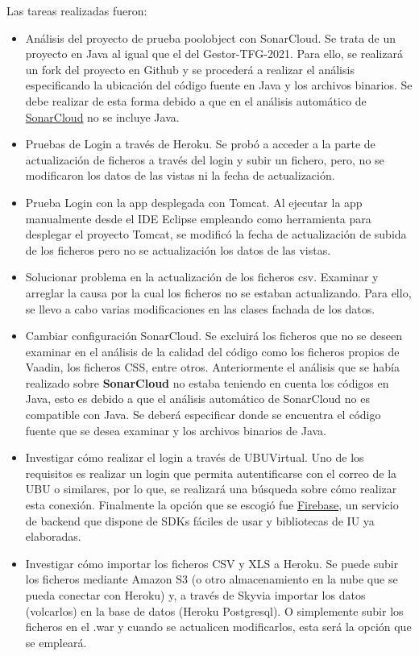Las tareas realizadas fueron:
\begin{itemize}
	\tightlist
	\item Análisis del proyecto de prueba poolobject con SonarCloud.
		Se trata de un proyecto en Java al igual que el del Gestor-TFG-2021. Para ello, se realizará un fork del proyecto en Github y se procederá a realizar el análisis especificando la ubicación del código fuente en Java y los archivos binarios. Se debe realizar de esta forma debido a que en el análisis automático de \href{https://sonarcloud.io/}{SonarCloud} no se incluye Java.
	\item Pruebas de Login a través de Heroku. 
		Se probó a acceder a la parte de actualización de ficheros a través del login y subir un fichero, pero, no se modificaron los datos de las vistas ni la fecha de actualización.
	\item Prueba Login con la app desplegada con Tomcat. 
		Al ejecutar la app manualmente desde el IDE Eclipse empleando como herramienta para desplegar el proyecto Tomcat, se modificó la fecha de actualización de subida de los ficheros pero no se actualización los datos de las vistas.
	\item Solucionar problema en la actualización de los ficheros csv.
		 Examinar y arreglar la causa por la cual los ficheros no se estaban actualizando. Para ello, se llevo a cabo varias modificaciones en las clases fachada de los datos.
	\item Cambiar configuración SonarCloud. 
		Se excluirá los ficheros que no se deseen examinar en el análisis de la calidad del código como los ficheros propios de Vaadin, los ficheros CSS, entre otros. Anteriormente el análisis que se había realizado sobre \textbf{SonarCloud} no estaba teniendo en cuenta los códigos en Java, esto es debido a que el análisis automático de SonarCloud no es compatible con Java. Se deberá especificar donde se encuentra el código fuente que se desea examinar y los archivos binarios de Java.
	\item Investigar cómo realizar el login a través de UBUVirtual. 
		Uno de los requisitos es realizar un login que permita autentificarse con el correo de la UBU o similares, por lo que, se realizará una búsqueda sobre cómo realizar esta conexión. Finalmente la opción que se escogió fue \href{https://firebase.google.com/}{Firebase}, un servicio de backend que dispone de SDKs fáciles de usar y bibliotecas de IU ya elaboradas.
	\item Investigar cómo importar los ficheros CSV y XLS a Heroku.
		Se puede subir los ficheros mediante Amazon S3 (o otro almacenamiento en la nube que se pueda conectar con Heroku) y, a través de Skyvia importar los datos (volcarlos) en la base de datos (Heroku Postgresql). O simplemente subir los ficheros en el .war y cuando se actualicen modificarlos, esta será la opción que se empleará.

\end{itemize}
